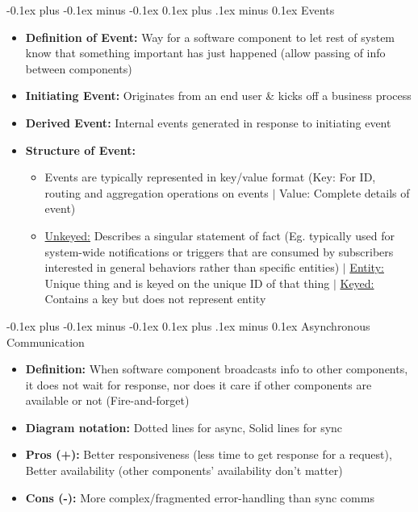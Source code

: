 \documentclass[landscape]{article}
\makeatletter
\renewcommand{\subsection}{\@startsection{subsection}{2}{0mm}%
  {-0.1ex plus -0.1ex minus -0.1ex}%
  {0.1ex plus .1ex minus 0.1ex}%
{\normalfont\scriptsize\bfseries}}
\makeatother
\begin{document}
\begin{multicols*}{5}
    \subsection{Events}
    \begin{itemize}
      \item \textbf{Definition of Event:} Way for a software component to let rest of system know that something important has just happened (allow passing of info between components)
      \item \textbf{Initiating Event:} Originates from an end user \& kicks off a business process
      \item \textbf{Derived Event:} Internal events generated in response to initiating event
      \item \textbf{Structure of Event:}
      \begin{itemize}
        \item Events are typically represented in key/value format (Key: For ID, routing and aggregation operations on events $|$ Value: Complete details of event)
        \item \underline{Unkeyed:} Describes a singular statement of fact (Eg. typically used for system-wide notifications or triggers that are consumed by subscribers interested in general behaviors rather than specific entities) $|$ \underline{Entity:} Unique thing and is keyed on the unique ID of that thing $|$ \underline{Keyed:} Contains a key but does not represent entity
      \end{itemize}
    \end{itemize}

    \subsection{Asynchronous Communication}
    \begin{itemize}
      \item \textbf{Definition:} When software component broadcasts info to other components, it does not wait for response, nor does it care if other components are available or not (Fire-and-forget)
      \item \textbf{Diagram notation:} Dotted lines for async, Solid lines for sync
      \item \textbf{Pros (+):} Better responsiveness (less time to get response for a request), Better availability (other components' availability don't matter)
      \item \textbf{Cons (-):} More complex/fragmented error-handling than sync comms 
    \end{itemize}


\end{multicols*}
\end{document}
